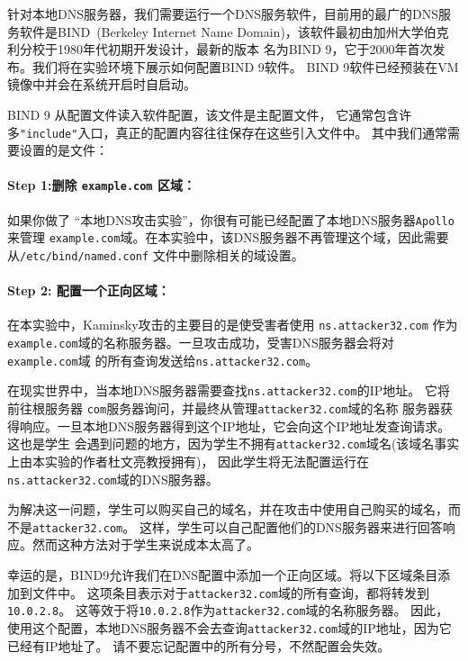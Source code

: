 针对本地DNS服务器，我们需要运行一个DNS服务软件，目前用的最广的DNS服务软件是BIND~(Berkeley Internet Name
Domain)，该软件最初由加州大学伯克利分校于1980年代初期开发设计，最新的版本
名为BIND 9，它于2000年首次发布。我们将在实验环境下展示如何配置BIND 9软件。
BIND 9软件已经预装在\ubuntu VM镜像中并会在系统开启时自启动。


BIND 9 从配置文件读入软件配置，该文件是主配置文件，
它通常包含许多\texttt{"include"}入口，真正的配置内容往往保存在这些引入文件中。
其中我们通常需要设置的是文件：


\paragraph{Step 1:删除 {\tt example.com} 区域：}
如果你做了 ``本地DNS攻击实验''，你很有可能已经配置了本地DNS服务器{\tt Apollo}来管理
{\tt example.com}域。在本实验中，该DNS服务器不再管理这个域，因此需要从{\tt /etc/bind/named.conf}
文件中删除相关的域设置。



\paragraph{Step 2: 配置一个正向区域：}
在本实验中，Kaminsky攻击的主要目的是使受害者使用 \texttt{ns.attacker32.com} 作为
\texttt{example.com}域的名称服务器。一旦攻击成功，受害DNS服务器会将对\texttt{example.com}域
的所有查询发送给\texttt{ns.attacker32.com}。 



在现实世界中，当本地DNS服务器需要查找\texttt{ns.attacker32.com}的IP地址。
它将前往根服务器 \texttt{com}服务器询问，并最终从管理\texttt{attacker32.com}域的名称
服务器获得响应。一旦本地DNS服务器得到这个IP地址，它会向这个IP地址发查询请求。这也是学生
会遇到问题的地方，因为学生不拥有\texttt{attacker32.com}域名(该域名事实上由本实验的作者杜文亮教授拥有)，
因此学生将无法配置运行在\texttt{ns.attacker32.com}域的DNS服务器。


为解决这一问题，学生可以购买自己的域名，并在攻击中使用自己购买的域名，而不是\texttt{attacker32.com}。
这样，学生可以自己配置他们的DNS服务器来进行回答响应。然而这种方法对于学生来说成本太高了。
 

幸运的是，BIND9允许我们在DNS配置中添加一个正向区域。将以下区域条目添加到文件中。
这项条目表示对于\texttt{attacker32.com}域的所有查询，都将转发到\texttt{10.0.2.8}。
这等效于将\texttt{10.0.2.8}作为\texttt{attacker32.com}域的名称服务器。
因此，使用这个配置，本地DNS服务器不会去查询\texttt{attacker32.com}域的IP地址，因为它已经有IP地址了。
请不要忘记配置中的所有分号，不然配置会失效。


